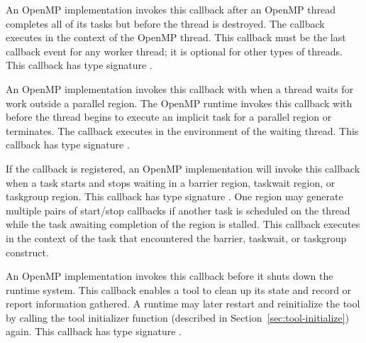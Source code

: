 \label{sec:ompt_callback_thread_end}

An OpenMP implementation invokes this callback after an OpenMP thread
completes all of its tasks but before the thread is destroyed. The
callback executes in the context of the OpenMP thread. This callback
must be the last callback event for any worker thread; it is optional
for other types of threads.  This callback has type signature
.

\label{sec:ompt_callback_idle}

An OpenMP implementation invokes this callback with
 when a thread waits for work
outside a parallel region.  The OpenMP runtime invokes this callback
with  before the thread begins
to execute an implicit task for a parallel region or terminates. The
callback executes in the environment of the waiting thread.  This
callback has type signature .

\label{sec:ompt_callback_sync_region_wait}

If the  callback is registered,
an OpenMP implementation will invoke this callback when a task starts
and stops waiting in a barrier region, taskwait region, or taskgroup
region.  This callback has type signature
.  One region may generate
multiple pairs of start/stop callbacks if another task is scheduled on
the thread while the task awaiting completion of the region is
stalled.  This callback executes in the context of the task that
encountered the barrier, taskwait, or taskgroup construct.

\label{sec:ompt_callback_runtime_shutdown}

An OpenMP implementation invokes this callback before it shuts down
the runtime system.  This callback enables a tool to clean up its
state and record or report information gathered. A runtime may later
restart and reinitialize the tool by calling the tool initializer
function (described in Section~\ref{sec:tool-initialize}) again.  This
callback has type signature .

